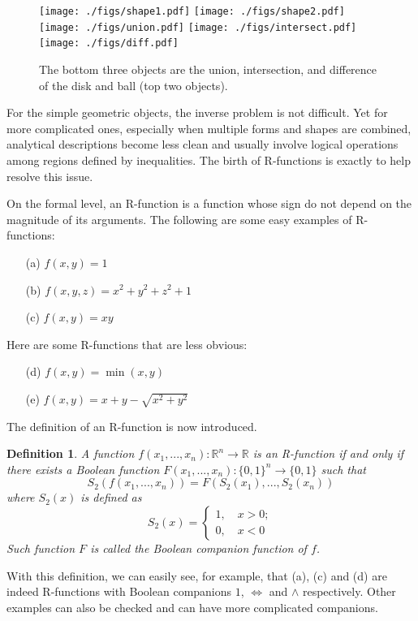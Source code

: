 \documentclass[11pt,reqno]{amsart}
\newtheorem{definition}{Definition}%
\theoremstyle{definition}
\begin{document}
\begin{figure}
\texttt{[image: ./figs/shape1.pdf]}
\texttt{[image: ./figs/shape2.pdf]}
\\
\texttt{[image: ./figs/union.pdf]}
\texttt{[image: ./figs/intersect.pdf]}
\texttt{[image: ./figs/diff.pdf]}
\caption{The bottom three objects are the union, intersection, and difference of the disk and ball (top two objects).}
\label{DiskAndBall}
\end{figure}

For the simple geometric objects, the inverse problem is not
difficult. Yet for more complicated ones, especially when multiple forms
and shapes are combined, analytical descriptions become less clean and usually involve logical operations among regions defined by inequalities. The birth of R-functions is exactly to help resolve this issue.    

On the formal level, an R-function is a function whose sign do not depend on the magnitude of its arguments.  The following are some easy  examples of R-functions: 
\begin{enumerate}
\item[(a)] $f(x,y) = 1$
\item[(b)] $f(x,y,z) = x^2+y^2+z^2+1$
\item[(c)] $f(x,y) = xy$
\end{enumerate}
Here are some R-functions that are less obvious:
\begin{enumerate}
\item[(d)] $f(x,y) = \min(x,y)$
\item[(e)] $f(x,y) = x+y-\sqrt{x^2+y^2}$
\end{enumerate}
The definition of an R-function is now introduced.
\begin{definition}
A function $f(x_1,...,x_n):\mathbb{R}^n\to\mathbb{R}$ is an R-function if and only if there exists a Boolean function $F(x_1,...,x_n):\{0,1\}^n\to \{0,1\}$ such that
$$S_2(f(x_1,...,x_n))=F(S_2(x_1),...,S_2(x_n))$$
where $S_2(x)$ is defined as
$$S_2(x)=\begin{cases} 1,\quad x>0;\\ 0, \quad x<0\end{cases}$$
Such function $F$ is called the Boolean companion function of $f$.
\end{definition}

With this definition, we can easily see, for example, that (a), (c) and (d) are indeed R-functions with Boolean companions $1$, $\Leftrightarrow$ and $\wedge$
respectively. Other examples can also be checked and can have more complicated
companions. 
\end{document}
